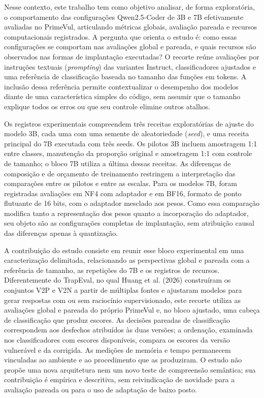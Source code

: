 \documentclass[12pt,a4paper]{article}
\begin{document}
Nesse contexto, este trabalho tem como objetivo analisar, de forma exploratória, o comportamento das configurações Qwen2.5-Coder de 3B e 7B efetivamente avaliadas no PrimeVul, articulando métricas globais, avaliação pareada e recursos computacionais registrados. A pergunta que orienta o estudo é: como essas configurações se comportam nas avaliações global e pareada, e quais recursos são observados nas formas de implantação executadas? O recorte reúne avaliações por instruções textuais (\textit{prompting}) das variantes Instruct, classificadores ajustados e uma referência de classificação baseada no tamanho das funções em tokens. A inclusão dessa referência permite contextualizar o desempenho dos modelos diante de uma característica simples do código, sem assumir que o tamanho explique todos os erros ou que seu controle elimine outros atalhos.

Os registros experimentais compreendem três receitas exploratórias de ajuste do modelo 3B, cada uma com uma semente de aleatoriedade (\textit{seed}), e uma receita principal do 7B executada com três seeds. Os pilotos 3B incluem amostragem 1:1 entre classes, manutenção da proporção original e amostragem 1:1 com controle de tamanho; o bloco 7B utiliza a última dessas receitas. As diferenças de composição e de orçamento de treinamento restringem a interpretação das comparações entre os pilotos e entre as escalas. Para os modelos 7B, foram registradas avaliações em NF4 com adaptador e em BF16, formato de ponto flutuante de 16 bits, com o adaptador mesclado aos pesos. Como essa comparação modifica tanto a representação dos pesos quanto a incorporação do adaptador, seu objeto são as configurações completas de implantação, sem atribuição causal das diferenças apenas à quantização.

A contribuição do estudo consiste em reunir esse bloco experimental em uma caracterização delimitada, relacionando as perspectivas global e pareada com a referência de tamanho, as repetições do 7B e os registros de recursos. Diferentemente do TrapEval, no qual Huang et al. (2026) construíram os conjuntos V2P e V2N a partir de múltiplas fontes e ajustaram modelos para gerar respostas com ou sem raciocínio supervisionado, este recorte utiliza as avaliações global e pareada do próprio PrimeVul e, no bloco ajustado, uma cabeça de classificação que produz escores. As decisões pareadas de classificação correspondem aos desfechos atribuídos às duas versões; a ordenação, examinada nos classificadores com escores disponíveis, compara os escores da versão vulnerável e da corrigida. As medições de memória e tempo permanecem vinculadas ao ambiente e ao procedimento que as produziram. O estudo não propõe uma nova arquitetura nem um novo teste de compreensão semântica; sua contribuição é empírica e descritiva, sem reivindicação de novidade para a avaliação pareada ou para o uso de adaptação de baixo posto.
\end{document}
